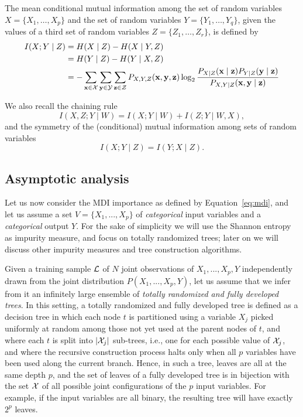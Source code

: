 The mean conditional mutual information among the set of random variables $X
=\{X_{1}, \ldots , X_{p}\}$ and the set of random variables $Y=\{Y_{1}, \ldots
, Y_{q}\}$, given the values of a third set of random variables $Z=\{Z_{1},
\ldots , Z_{r}\}$, is defined by
 \begin{align}
 I(X; Y \mid Z) &= H(X \mid Z) - H(X \mid Y, Z)\\
 & = H(Y \mid Z) - H(Y \mid X, Z) \nonumber\\
& = - \sum_{\mathbf{x} \in {\cal X}} \sum_{\mathbf{y} \in {\cal Y}} \sum_{\mathbf{z} \in {\cal Z}} P_{X, Y, Z} (\mathbf{x}, \mathbf{y}, \mathbf{z}) \log_{2} \frac{P_{X \mid Z}(\mathbf{x} \mid \mathbf{z}) P_{Y\mid Z}(\mathbf{y} \mid \mathbf{z})}{P_{X,Y \mid Z}(\mathbf{x},\mathbf{y} \mid \mathbf{z})}\nonumber
\end{align}

We also recall the chaining rule
\begin{equation}
I(X, Z ; Y \mid W ) = I(X; Y \mid W  ) + I( Z ; Y \mid W, X),
\end{equation}
and the symmetry of the (conditional) mutual information among sets of random variables
\begin{equation}
I(X ; Y \mid Z) = I(Y ;  X  \mid Z).
\end{equation}


\subsection{Asymptotic analysis}

Let us now consider the MDI  importance as defined by Equation~\ref{eq:mdi},
and let us assume a set $V= \{X_1, ..., X_p\}$  of {\em categorical} input
variables and a {\em categorical} output $Y$. For the sake of simplicity we
will  use the Shannon entropy as impurity measure, and focus on totally
randomized trees; later on we will discuss other impurity measures and tree
construction algorithms.

Given a training sample ${\cal L}$ of $N$ joint observations of $X_1, ..., X_p,
Y$ independently drawn from the joint distribution $P(X_1, ..., X_p, Y)$, let us
assume that we infer from it an infinitely large ensemble of \textit{totally
randomized and fully developed trees}. In this setting, a totally randomized and
fully developed tree is defined as a decision tree in which each node $t$ is
partitioned using a variable $X_j$ picked uniformly at random among those not
yet used at the parent nodes of $t$, and where each $t$ is split into $|{\cal
X}_j|$ sub-trees, i.e., one for each possible value of ${\cal X}_j$, and where
the recursive construction process halts only when all $p$ variables have been
used along the current branch.  Hence, in such a tree, leaves are all at the
same depth $p$, and the set of leaves of a fully developed tree is in bijection
with the set $\cal X$ of all possible joint configurations of the $p$ input
variables. For example, if the input variables are all binary, the resulting
tree will have exactly $2^{p}$ leaves.

